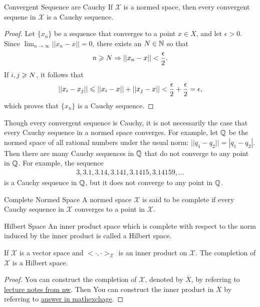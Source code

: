 \begin{proposition}{Convergent Sequence are Cauchy}{}
    If $\mathcal{X}$ is a normed space, then every convergent sequene in $\mathcal{X}$ is a Cauchy sequence.
\end{proposition}
\begin{proof}
    Let $\{x_n\}$ be a sequence that converges to a point $x\in X$, and let $\epsilon>0$. Since $\lim_{n\rightarrow \infty}||x_n-x||=0$, there exists an $N\in \mathbb{N}$ so that
    \begin{align*}
        n\geqslant N\Rightarrow ||x_n-x||<\frac{\epsilon}{2}.
    \end{align*}
    If $i,j\geqslant N$, it follows that
    \begin{align*}
        ||x_i-x_j||\leqslant ||x_i-x||+||x_j-x||<\frac{\epsilon}{2} + \frac{\epsilon}{2}=\epsilon,
    \end{align*}
    which proves that $\{x_n\}$ is a Cauchy sequence.
\end{proof}
Though every convergent sequence is Cauchy, it is not necessarily the case that
every Cauchy sequence in a normed space converges. For example, let $\mathbb{Q}$ be the normed
space of all rational numbers under the usual norm: $||q_1-q_2||=|q_1-q_2|$. 
Then there are many Cauchy sequences in $\mathbb{Q}$ that do not converge to any point in $\mathbb{Q}$.
For example, the sequence
\begin{align*}
    3, 3.1, 3.14, 3.141, 3.1415, 3.14159, ...
\end{align*}
is a Cauchy sequence in $\mathbb{Q}$, but it does not converge to any point in $\mathbb{Q}$.

\begin{definition}{Complete Normed Space}{}
    A normed space $\mathcal{X}$ is said to be complete if every Cauchy sequence in $\mathcal{X}$ converges to a point in $\mathcal{X}$.    
\end{definition}


\begin{definition}{Hilbert Space}{}
    An inner product space which is complete with respect to the norm induced by 
    the inner product is called a Hilbert space.
\end{definition}


\begin{proposition}{}{}
    If $\mathcal{X}$ is a vector space and $<\cdot,\cdot>_{\mathcal{X}}$ is an inner product on $\mathcal{X}$.
    The completion of $\mathcal{X}$ is a Hilbert space. 
\end{proposition}
\begin{proof}
    You can construct the completion of $\mathcal{X}$, denoted by $\overline{X}$, by referring to \href{https://sites.math.northwestern.edu/~scanez/courses/320/notes/completion.pdf}{lecture notes from nw}. 
    Then You can construct the inner product in $\overline{X}$ by referring to \href{https://math.stackexchange.com/questions/1234209/if-x-is-an-inner-product-space-then-is-its-completion-a-hilbert-space}{answer in mathexchage}.
\end{proof}

